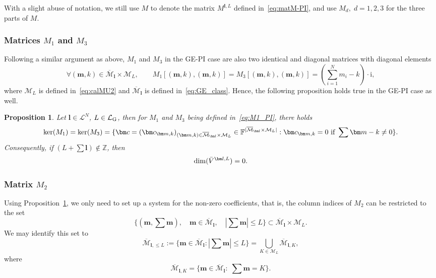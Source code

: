 \documentclass{article}
\newcommand{\bV}{{\bar V}}
\newcommand{\card}[1]{|{#1}|}
\newcommand{\dimpi}[2]{\dim(\bV^{#1,#2})}
\newtheorem{proposition}[theorem]{Proposition}
\numberwithin{equation}{section}
\def\Z{\mathbb{Z}}
\def\F{\mathbb{F}}
\def\bc{{\bm c}}
\def\bl{{\bm l}}
\def\bbm{{\bm m}}
\def\calM{\mathcal{M}}
\def\calL{\mathcal{L}}
\def\calLG{\mathcal{\calL_{\rm G}}}
\def\oMl{\overline{\calM}_\bl}
\def\oMlK{\overline{\calM}_{\bl,K}}
\def\MlL{{M}}
\def\dim{{{\rm dim}}}
\begin{document}
With a slight abuse of notation, we still use $\MlL$ to denote the matrix $M^{\bl,L}$ defined in~\eqref{eq:matM-PI}, and use $\MlL_d,\;d=1,2,3$ for the three parts of $\MlL$. 
\subsubsection{Matrices $\MlL_1$ and $\MlL_3$}

Following a similar argument as above, $\MlL_1$ and $\MlL_3$ in the GE-PI case are also two identical and diagonal matrices with diagonal elements
\begin{equation}
\label{eq:M1_PI}
        \forall (\bbm,k)\in {\oMl}\times\calM_L, \qquad \MlL_1[(\bbm,k),(\bbm,k)] = \MlL_3[(\bbm,k),(\bbm,k)] = \left(\sum_{i=1}^N m_i -k\right)\cdot \mathrm{i},
\end{equation}
where $\calM_L$ is defined in~\eqref{eq:calMU2} and  $\oMl$ is defined in~\eqref{eq:GE_class}. 
Hence, the following proposition holds true in the GE-PI case as well.

\begin{proposition}\label{prop:ker-M1-GEPI}
    Let $\bl\in \calL^N$, $L\in \calLG$, then for $\MlL_1$ and $\MlL_3$ being defined in~\eqref{eq:M1_PI}, there holds
    \[
        \ker(\MlL_1) = \ker(\MlL_3) = \{\bc=(\bc_{\bbm,k})_{(\bbm,k)\in\oMl\times\calM_L}\in\F^{\card{\oMl\times\calM_L}}: \bc_{\bbm,k} = 0 \textup{ if } \sum\bbm -k \neq 0\}.
    \]
    Consequently, if $(L+\sum\bl)\notin\Z$, then
    \[ 
        \dimpi{\bl}{L}=
        0.
    \]
\end{proposition}


\subsubsection{Matrix $\MlL_2$}
Using Proposition~\ref{prop:ker-M1-GEPI}, we only need to set up a system for the non-zero coefficients, that is, the column indices of $\MlL_2$ can be restricted to the set
\[
    \big\{(\bbm,\sum \bbm), \quad  \bbm\in\oMl, \quad |\sum \bbm| \le L\big\}\subset\oMl\times\calM_L.
\]
We may identify this set to 
\[
    \overline{\calM}_{\bl,\le L} := \Big\{\bbm\in\oMl:|\sum \bbm| \le L
    \Big\}=\bigcup_{K\in\calM_L}\oMlK, 
\]
where 
\[
    \oMlK = \{\bbm\in\oMl: \; \sum\bbm=K\}.
\]
\end{document}
